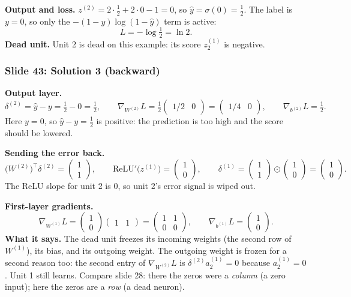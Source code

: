 \textbf{Output and loss.} $z^{(2)}=2\cdot\tfrac12+2\cdot0-1=0$, so $\hat{y}=\sigma(0)=\tfrac12$. The label is $y=0$, so only the $-(1-y)\log(1-\hat{y})$ term is active:
\[
L=-\log\tfrac12=\ln2 .
\]
\textbf{Dead unit.} Unit 2 is dead on this example: its score $z^{(1)}_2$ is negative.

\subsubsection{Slide 43: Solution 3 (backward)}

\textbf{Output layer.}
\[
\delta^{(2)}=\hat{y}-y=\tfrac12-0=\tfrac12, \qquad \nabla_{W^{(2)}}L=\tfrac12\begin{pmatrix}1/2&0\end{pmatrix}=\begin{pmatrix}1/4&0\end{pmatrix}, \qquad \nabla_{b^{(2)}}L=\tfrac12 .
\]
Here $y=0$, so $\hat{y}-y=\tfrac12$ is positive: the prediction is too high and the score should be lowered.

\textbf{Sending the error back.}
\[
\big(W^{(2)}\big)^\top\delta^{(2)}=\begin{pmatrix}1\\1\end{pmatrix}, \qquad \text{ReLU}'\big(z^{(1)}\big)=\begin{pmatrix}1\\0\end{pmatrix}, \qquad \delta^{(1)}=\begin{pmatrix}1\\1\end{pmatrix}\odot\begin{pmatrix}1\\0\end{pmatrix}=\begin{pmatrix}1\\0\end{pmatrix}.
\]
The ReLU slope for unit 2 is $0$, so unit 2's error signal is wiped out.

\textbf{First-layer gradients.}
\[
\nabla_{W^{(1)}}L=\begin{pmatrix}1\\0\end{pmatrix}\begin{pmatrix}1&1\end{pmatrix}=\begin{pmatrix}1&1\\0&0\end{pmatrix}, \qquad \nabla_{b^{(1)}}L=\begin{pmatrix}1\\0\end{pmatrix}.
\]
\textbf{What it says.} The dead unit freezes its incoming weights (the second row of $W^{(1)}$), its bias, and its outgoing weight. The outgoing weight is frozen for a second reason too: the second entry of $\nabla_{W^{(2)}}L$ is $\delta^{(2)}a^{(1)}_2=0$ because $a^{(1)}_2=0$. Unit 1 still learns. Compare slide 28: there the zeros were a \emph{column} (a zero input); here the zeros are a \emph{row} (a dead neuron).


